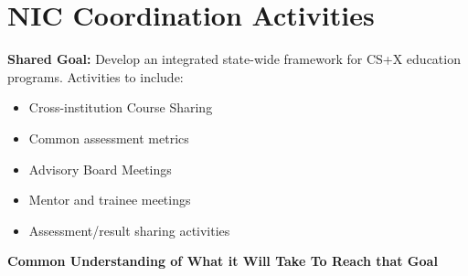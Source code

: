 \section{NIC Coordination Activities}


\textbf{Shared Goal:} Develop an integrated state-wide framework for CS+X education programs.
Activities to include:
\begin{itemize}
    \item Cross-institution Course Sharing
    \item Common assessment metrics
    \item Advisory Board Meetings
    \item Mentor and trainee meetings
    \item Assessment/result sharing activities
\end{itemize}
\textbf{Common Understanding of What it Will Take To Reach that Goal}